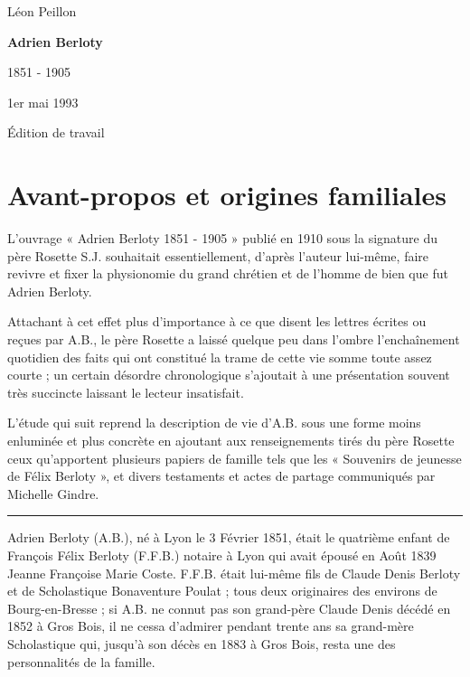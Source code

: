 \documentclass[11pt,a4paper]{report}
\providecommand{\releaseversion}{Édition de travail}
\begin{document}
\begin{titlepage}
\centering
\vspace*{1.8cm}
{\Large Léon Peillon\par}
\vspace{1.8cm}
{\Huge\bfseries Adrien Berloty\par}
\vspace{0.8cm}
{\LARGE 1851 - 1905\par}
\vfill
{\large 1er mai 1993\par}
\vspace{1cm}
{\small \releaseversion\par}
\end{titlepage}
\tableofcontents
\clearpage


\chapter{Avant-propos et origines familiales}\label{avant-propos-et-origines-familiales}

L'ouvrage « Adrien Berloty 1851 - 1905 » publié en 1910 sous la signature du père Rosette S.J. souhaitait essentiellement, d'après l'auteur lui-même, faire revivre et fixer la physionomie du grand chrétien et de l'homme de bien que fut Adrien Berloty.

Attachant à cet effet plus d'importance à ce que disent les lettres écrites ou reçues par A.B., le père Rosette a laissé quelque peu dans l'ombre l'enchaînement quotidien des faits qui ont constitué la trame de cette vie somme toute assez courte ; un certain désordre chronologique s'ajoutait à une présentation souvent très succincte laissant le lecteur insatisfait.

L'étude qui suit reprend la description de vie d'A.B. sous une forme moins enluminée et plus concrète en ajoutant aux renseignements tirés du père Rosette ceux qu'apportent plusieurs papiers de famille tels que les « Souvenirs de jeunesse de Félix Berloty », et divers testaments et actes de partage communiqués par Michelle Gindre.

\begin{center}\rule{0.5\linewidth}{0.5pt}\end{center}

Adrien Berloty (A.B.), né à Lyon le 3 Février 1851, était le quatrième enfant de François Félix Berloty (F.F.B.) notaire à Lyon qui avait épousé en Août 1839 Jeanne Françoise Marie Coste. F.F.B. était lui-même fils de Claude Denis Berloty et de Scholastique Bonaventure Poulat ; tous deux originaires des environs de Bourg-en-Bresse ; si A.B. ne connut pas son grand-père Claude Denis décédé en 1852 à Gros Bois, il ne cessa d'admirer pendant trente ans sa grand-mère Scholastique qui, jusqu'à son décès en 1883 à Gros Bois, resta une des personnalités de la famille.
\end{document}
